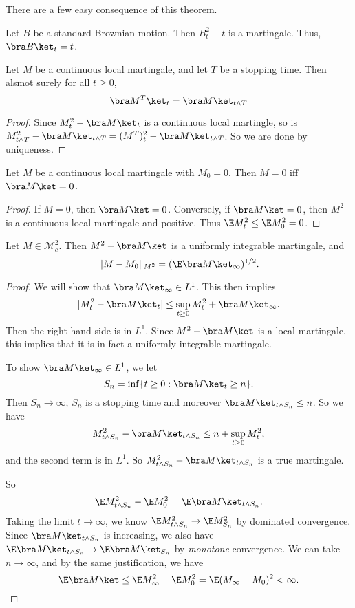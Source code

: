 \documentclass[a4paper]{article}
\begin{document}
There are a few easy consequence of this theorem.
\begin{eg}
  Let $B$ be a standard Brownian motion. Then $B_t^2 - t$ is a martingale. Thus, $\bra B \ket_t = t$.
\end{eg}

\begin{fact}
  Let $M$ be a continuous local martingale, and let $T$ be a stopping time. Then alsmot surely for all $t \geq 0$,
  \[
    \bra M^T\ket_t = \bra M\ket_{t \wedge T}
  \]
\end{fact}

\begin{proof}
  Since $M_t^2 - \bra M\ket_t$ is a continuous local martingle, so is $M^2_{t \wedge T} - \bra M\ket_{t \wedge T} = (M^T)_t^2 - \bra M\ket_{t \wedge T}$. So we are done by uniqueness.
\end{proof}

\begin{fact}
  Let $M$ be a continuous local martingale with $M_0 = 0$. Then $M = 0$ iff $\bra M\ket = 0$.
\end{fact}

\begin{proof}
  If $M = 0$, then $\bra M \ket = 0$. Conversely, if $\bra M\ket = 0$, then $M^2$ is a continuous local martingale and positive. Thus $\E M_t^2 \leq \E M_0^2 = 0$.
\end{proof}

\begin{prop}
  Let $M \in \mathcal{M}_c^2$. Then $M^2 - \bra M\ket$ is a uniformly integrable martingale, and
  \[
    \|M - M_0\|_{M^2} = (\E \bra M\ket_\infty)^{1/2}.
  \]
\end{prop}

\begin{proof}
  We will show that $\bra M\ket_\infty \in L^1$. This then implies
  \[
    |M_t^2 - \bra M\ket_t| \leq \sup_{t \geq 0} M_t^2 + \bra M\ket_\infty.
  \]
  Then the right hand side is in $L^1$. Since $M^2 - \bra M\ket$ is a local martingale, this implies that it is in fact a uniformly integrable martingale.

  To show $\bra M\ket_\infty \in L^1$, we let
  \[
    S_n = \inf \{t \geq 0: \bra M\ket_t \geq n\}.
  \]
  Then $S_n \to \infty$, $S_n$ is a stopping time and moreover $\bra M\ket_{t \wedge S_n} \leq n$. So we have
  \[
    M_{t \wedge S_n}^2 - \bra M\ket_{t \wedge S_n} \leq n + \sup_{t \geq 0} M_t^2,
  \]
  and the second term is in $L^1$. So $M_{t \wedge S_n}^2 - \bra M\ket_{t \wedge S_n}$ is a true martingale.

  So
  \[
    \E M_{t \wedge S_n}^2 - \E M_0^2 = \E \bra M\ket_{t \wedge S_n}.
  \]
  Taking the limit $t\to \infty$, we know $\E M_{t \wedge S_n}^2 \to \E M^2_{S_n}$ by dominated convergence. Since $\bra M\ket_{t \wedge S_n}$ is increasing, we also have $\E \bra M\ket_{t \wedge S_n} \to \E \bra M\ket_{S_n}$ by \emph{monotone} convergence. We can take $n \to \infty$, and by the same justification, we have
  \[
    \E \bra M\ket \leq \E M_\infty^2 - \E M_0^2 = \E (M_\infty - M_0)^2 < \infty.\qedhere
  \]
\end{proof}
\end{document}
